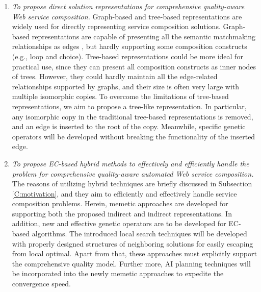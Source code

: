 \begin{enumerate}
\begin{enumerate}
    
    \item \emph{To propose direct solution representations for comprehensive quality-aware Web service composition.} Graph-based and tree-based representations are widely used for directly representing service composition solutions. Graph-based representations are capable of presenting all the semantic matchmaking relationships as edges \cite{lecue2009optimizing,wang2017comprehensive}, but hardly supporting some composition constructs (e.g., loop and choice). Tree-based representations could be more ideal for practical use, since they can present all composition constructs as inner nodes of trees. However, they could hardly maintain all the edge-related relationships supported by graphs, and their size is often very large with multiple  isomorphic copies. To overcome the limitations of tree-based representations, we aim to propose a tree-like representation. In particular, any isomorphic copy in the traditional tree-based representations is removed, and an edge is inserted to the root of the copy. Meanwhile, specific  genetic operators will be developed without breaking the functionality of the inserted edge.
        
    \item \emph{To propose EC-based hybrid methods to effectively and efficiently handle the problem for comprehensive quality-aware automated Web service composition.} The reasons of utilizing hybrid techniques are briefly discussed in Subsection \ref{C:motivation}, and they aim to efficiently and effectively handle service composition problems. Herein, memetic approaches are developed for supporting both the proposed indirect and indirect representations. In addition, new and effective genetic operators are to be developed for EC-based algorithms. The introduced local search techniques will be developed with properly designed structures of neighboring solutions for easily escaping from local optimal. Apart from that, these approaches must explicitly support the comprehensive quality model. Further more, AI planning techniques will be incorporated into the newly memetic approaches to expedite the convergence speed.
  \end{enumerate}
 

\end{enumerate}
